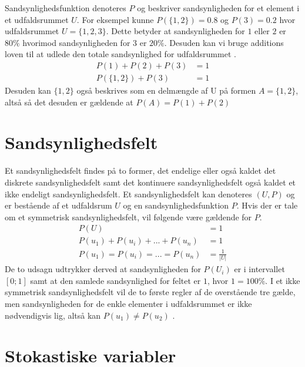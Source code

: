 \documentclass[../../SRP.tex]{subfiles}
\begin{document}
Sandsynlighedsfunktion denoteres $P$ og beskriver sandsynligheden for et element i et udfaldsrummet $U$. For eksempel kunne $P(\{1,2\}) = 0.8$ og $P(3) = 0.2$ hvor udfaldsrummet $U = \{1,2,3\}$. Dette betyder at sandsynligheden for $1$ eller $2$ er $80\%$ hvorimod sandsynligheden for $3$ er $20\%$. Desuden kan vi bruge additions loven til at udlede den totale sandsynlighed for udfaldsrummet \cite{SC}.
\begin{align}
  P(1) + P(2) + P(3) &= 1 \\
  P(\{1,2\}) + P(3) &= 1
\end{align}
Desuden kan $\{1,2\}$ også beskrives som en delmængde af U på formen $A = \{1,2\}$, altså så det desuden er gældende at $P(A) = P(1) + P(2)$

\section{Sandsynlighedsfelt}

Et sandsynlighedsfelt findes på to former, det endelige eller også kaldet det diskrete sandsynlighedsfelt samt det kontinuere sandsynlighedsfelt også kaldet et ikke endeligt sandsynlighedsfelt. Et sandsynlighedsfelt kan denoteres $(U, P)$ og er bestående af et udfaldsrum $U$ og en sandsynlighedsfunktion $P$. Hvis der er tale om et symmetrisk sandsynlighedsfelt, vil følgende være gældende for $P$.
\begin{align}
  P(U) &= 1 \\
  P(u_1) + P(u_i) + ... + P(u_n) &= 1 \\
  P(u_1) = P(u_i) = ... = P(u_n) &= \frac{1}{|U|}
\end{align}
De to udsagn udtrykker derved at sandsynligheden for $P(U_i)$ er i intervallet $[0;1]$ samt at den samlede sandsynlighed for feltet er $1$, hvor $1 = 100\%$. I et ikke symmetrisk sandsynlighedsfelt vil de to første regler af de overstående tre gælde, men sandsynligheden for de enkle elementer i udfaldsrummet er ikke nødvendigvis lig, altså kan $P(u_1) \neq P(u_2)$ \cite{SC}.\\

\section{Stokastiske variabler}
\end{document}
